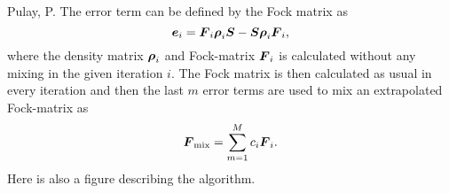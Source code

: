     Pulay, P. The error term can be defined by the Fock matrix as
        \begin{equation}
            \boldsymbol{{e}}_i = \boldsymbol{{F}}_i\boldsymbol{{\rho}}_i\boldsymbol{{S}} -
            \boldsymbol{{S}}\boldsymbol{{\rho}}_i\boldsymbol{{F}}_i,
        \end{equation}
    where the density matrix $\boldsymbol{{\rho}}_i$ and Fock-matrix $\boldsymbol{{F}}_i$ is
    calculated without any mixing in the given iteration $i$. The Fock matrix
    is then calculated as usual in every iteration and then the last $m$ error
    terms are used to mix an extrapolated Fock-matrix as
        \begin{equation}
            \blds{F}_{\text{mix}} = \suml{m=1}{M}c_i\blds{F}_i.
            \label{eq:extrapolF}
        \end{equation}
    Here is also a figure describing the algorithm.
